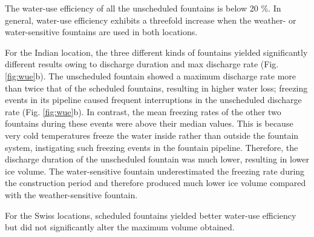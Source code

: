 The water-use efficiency of all the unscheduled fountains is below 20 \%. In general, water-use efficiency
exhibits a threefold increase when the weather- or water-sensitive fountains are used in both
locations.  

For the Indian location, the three different kinds of fountains yielded significantly different results owing to discharge
duration and max discharge rate
(Fig. \ref{fig:wue}b). The unscheduled fountain showed a maximum discharge rate more than twice that of
the scheduled fountains, resulting in higher water loss; freezing events in its pipeline caused frequent
interruptions in the unscheduled discharge rate (Fig. \ref{fig:wue}b). In contrast, the mean freezing
rates of the other two fountains during these events were above their median values. This is because very cold
temperatures freeze the water inside rather than outside the fountain system, instigating such freezing events in
the fountain pipeline. Therefore, the discharge duration of the unscheduled fountain was much lower, resulting in
lower ice volume. The water-sensitive fountain underestimated the freezing rate during the construction period
and therefore produced much lower ice volume compared with the weather-sensitive fountain. 

For the Swiss locations, scheduled fountains yielded better water-use efficiency but did not significantly alter the maximum
volume obtained. 

